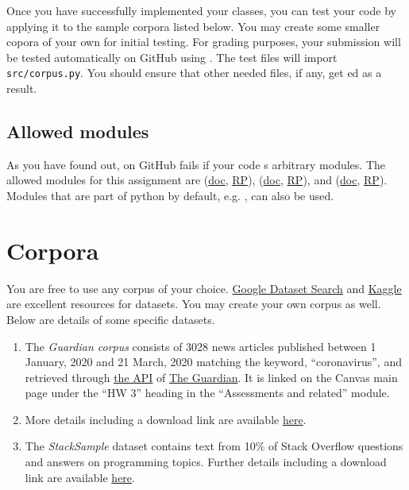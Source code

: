 \documentclass[addpoints]{exam}
\begin{document}
Once you have successfully implemented your classes, you can test your code by applying it to the sample corpora listed below. You may create some smaller copora of your own for initial testing. For grading purposes, your submission will be tested automatically on GitHub using . The test files will import \texttt{src/corpus.py}. You should ensure that other needed files, if any, get ed as a result.

\subsection{Allowed modules}

As you have found out,  on GitHub fails if your code s arbitrary modules. The allowed modules for this assignment are  (\href{https://docs.python.org/3/library/pathlib.html}{doc}, \href{https://realpython.com/python-pathlib/}{RP}),  (\href{https://docs.python.org/3/library/zipfile.html}{doc}, \href{https://realpython.com/python-zipfile/}{RP}), and  (\href{https://www.nltk.org}{doc}, \href{https://realpython.com/nltk-nlp-python/}{RP}). Modules that are part of python by default, e.g. , can also be used.

\section{Corpora}
\label{sec:corpora}

You are free to use any corpus of your choice. \href{https://datasetsearch.research.google.com}{Google Dataset Search} and \href{https://www.kaggle.com/datasets}{Kaggle} are excellent resources for datasets. You may create your own corpus as well. Below are details of some specific datasets.
\begin{enumerate}
\item The \textit{Guardian corpus} consists of 3028 news articles published between 1 January, 2020 and 21 March, 2020 matching the keyword, ``coronavirus'', and retrieved through \href{https://open-platform.theguardian.com}{the API} of \href{https://www.theguardian.com/}{The Guardian}. It is linked on the Canvas main page under the ``HW 3'' heading in the ``Assessments and related'' module.
\item {} More details including a download link are available \href{http://qwone.com/~jason/20Newsgroups/}{here}.
\item The \textit{StackSample} dataset contains text from 10\% of Stack Overflow questions and answers on programming topics. Further details including a download link are available \href{https://www.kaggle.com/datasets/stackoverflow/stacksample?fbclid=IwAR0kFAaMfLW9DViWaRapXd6xhdGmsnM56hExLL9aVqNfOPBeLvBOxkel85g}{here}.
\end{enumerate}
   
\end{document}
